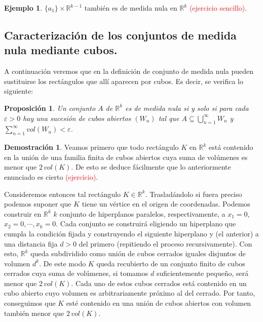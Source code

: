 \documentclass[12pt,twoside]{report}
\theoremstyle{azul}
\theoremstyle{azul2}
\theoremstyle{plain}
\newtheorem{pro}{Proposición}[chapter]
\theoremstyle{definition}
\newtheorem{eje}{Ejemplo}[chapter]
\newtheorem*{dem}{Demostración}
\theoremstyle{remark}
\begin{document}
\begin{eje}
$\{a_1\} \times \mathbb{R}^{k-1}$ también es de medida nula en $\mathbb{R}^k$ \textcolor{red}{(ejercicio sencillo)}.
\end{eje}
\subsection{Caracterización de los conjuntos de medida nula mediante cubos.}
A continuación veremos que en la definición de conjunto de medida nula pueden sustituirse los rectángulos que allí aparecen por cubos. Es decir, se verifica lo siguiente:
\begin{pro}
Un conjunto $A$ de $\mathbb{R}^k$ es de medida nula si y solo si para cada $\varepsilon > 0$ hay una sucesión de cubos abiertos $(W_n)$ tal que $A \subseteq \bigcup_{n=1}^{\infty} W_n$ y $\sum_{n=1}^{\infty} vol(W_n) < \varepsilon$. 
\end{pro}
\begin{dem}
Veamos primero que todo rectángulo $K$ en $\mathbb{R}^k$ está contenido en la unión de una familia finita de cubos abiertos cuya suma de volúmenes es menor que $2\, vol(K)$. De esto se deduce fácilmente que lo anteriormente enunciado es cierto \textcolor{red}{(ejercicio)}.

Consideremos entonces tal rectángulo $K \in \mathbb{R}^k$. Trasladándolo si fuera preciso podemos suponer que $K$ tiene un vértice en el origen de coordenadas. Podemos construir en $\mathbb{R}^k$ $k$ conjunto de hiperplanos paralelos, respectivamente, a $x_1 = 0$, $x_2 = 0 , \cdots , x_k=0$. Cada conjunto se construirá eligiendo un hiperplano que cumpla la condición fijada y construyendo el siguiente hiperplano y (el anterior) a una distancia fija $d>0$ del primero (repitiendo el proceso recursivamente). Con esto, $\mathbb{R}^k$ queda subdividido como unión de cubos cerrados iguales disjuntos de volumen $d^k$. De este modo $K$ queda recubierto de un conjunto finito de cubos cerrados cuya suma de volúmenes, si tomamos $d$ suficientemente pequeño, será menor que $2 \, vol(K)$. Cada uno de estos cubos cerrados está contenido en un cubo abierto cuyo volumen es arbitrariamente próximo al del cerrado. Por tanto, conseguimos que $K$ esté contenido en una unión de cubos abiertos con volumen también menor que $2 \, vol(K)$.
\end{dem}
\end{document}
